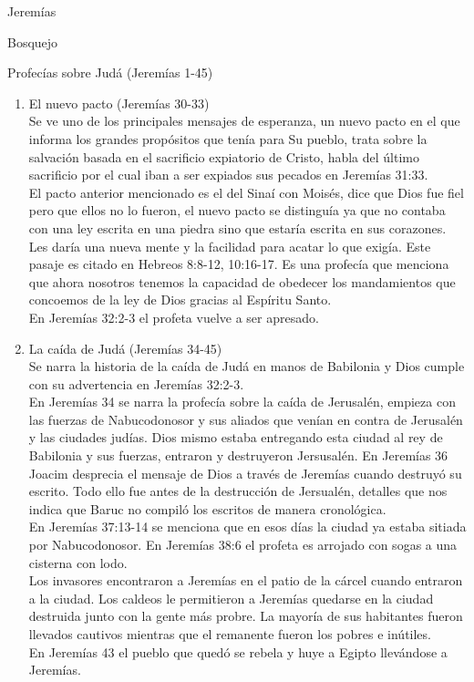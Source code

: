 \begin{section}{Jeremías}
\begin{subsection}{Bosquejo}
\begin{subsubsection}{Profecías sobre Judá (Jeremías 1-45)}
\begin{enumerate}
\begin{itemize}
						\end{itemize}
					\item El nuevo pacto (Jeremías 30-33)\\
						Se ve uno de los principales mensajes de esperanza, un nuevo pacto en el que informa los grandes propósitos que tenía para Su pueblo, trata sobre la salvación basada en el sacrificio expiatorio de Cristo, habla del último sacrificio por el cual iban a ser expiados sus pecados en Jeremías 31:33. \\
						El pacto anterior mencionado es el del Sinaí con Moisés, dice que Dios fue fiel pero que ellos no lo fueron, el nuevo pacto se distinguía ya que no contaba con una ley escrita en una piedra sino que estaría escrita en sus corazones. Les daría una nueva mente y la facilidad para acatar lo que exigía. Este pasaje es citado en Hebreos 8:8-12, 10:16-17. Es una profecía que menciona que ahora nosotros tenemos la capacidad de obedecer los mandamientos que concoemos de la ley de Dios gracias al Espíritu Santo.\\
						En Jeremías 32:2-3 el profeta vuelve a ser apresado.
						\newpage
					\item La caída de Judá (Jeremías 34-45)\\
						Se narra la historia de la caída de Judá en manos de Babilonia y Dios cumple con su advertencia en Jeremías 32:2-3.\\
						En Jeremías 34 se narra la profecía sobre la caída de Jerusalén, empieza con las fuerzas de Nabucodonosor y sus aliados que venían en contra de Jerusalén y las ciudades judías. Dios mismo estaba entregando esta ciudad al rey de Babilonia y sus fuerzas, entraron y destruyeron Jersusalén. En Jeremías 36 Joacim desprecia el mensaje de Dios a través de Jeremías cuando destruyó su escrito. Todo ello fue antes de la destrucción de Jersualén, detalles que nos indica que Baruc no compiló los escritos de manera cronológica.\\
						En Jeremías 37:13-14 se menciona que en esos días la ciudad ya estaba sitiada por Nabucodonosor. En Jeremías 38:6 el profeta es arrojado con sogas a una cisterna con lodo.\\
						Los invasores encontraron a Jeremías en el patio de la cárcel cuando entraron a la ciudad. Los caldeos le permitieron a Jeremías quedarse en la ciudad destruida junto con la gente más probre. La mayoría de sus habitantes fueron llevados cautivos mientras que el remanente fueron los pobres e inútiles.\\
						En Jeremías 43 el pueblo que quedó se rebela y huye a Egipto llevándose a Jeremías.

\end{enumerate}
\end{subsubsection}
\end{subsection}
\end{section}
